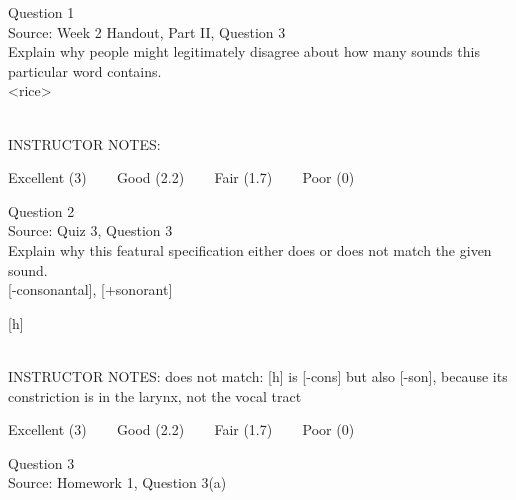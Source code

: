 \documentclass[12pt]{article}
\begin{document}
\begin{center}
\textbf{{\color{violet}{\HUGE 20201029 Thursday\\}}}

\textbf{{\color{violet}{\HUGE ALL EXAMS (with notes)\\}}}

\end{center}
\newpage

\begin{center}
\textbf{{\color{blue}{\HUGE START OF EXAM\\}}}

\textbf{{\color{blue}{\HUGE Student ID: 55466\\}}}

\textbf{{\color{blue}{\HUGE \\}}}

\end{center}
\newpage

{\large Question 1}\\

Source: Week 2 Handout, Part II, Question 3\\

Explain why people might legitimately disagree about how many sounds this particular word contains.\\

<rice>


~\\
INSTRUCTOR NOTES: 


\vfill
Excellent (3) ~~~ Good (2.2) ~~~ Fair (1.7) ~~~ Poor (0)
\newpage

{\large Question 2}\\

Source: Quiz 3, Question 3\\

Explain why this featural specification either does or does not match the given sound.\\

{[-consonantal]}, {[+sonorant]}

{[h]}


~\\
INSTRUCTOR NOTES: does not match: [h] is [-cons] but also [-son], because its constriction is in the larynx, not the vocal tract


\vfill
Excellent (3) ~~~ Good (2.2) ~~~ Fair (1.7) ~~~ Poor (0)
\newpage

{\large Question 3}\\

Source: Homework 1, Question 3(a)\\
\end{document}
